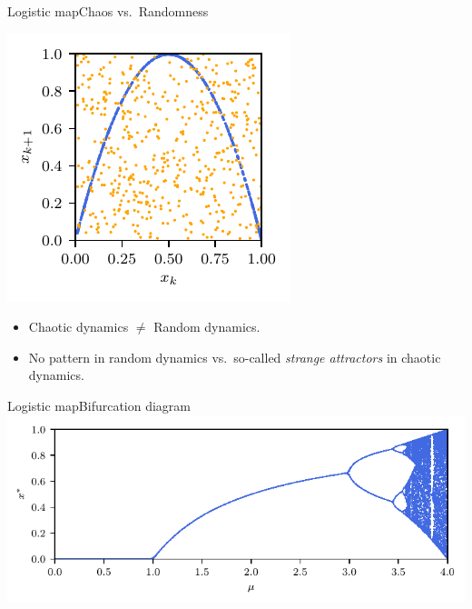 \documentclass[usenames,dvipsnames,svgnames,10pt,aspectratio=169]{beamer}
\begin{document}
\begin{frame}[t, c]{Logistic map}{Chaos vs.\ Randomness}
	\begin{minipage}{.48\textwidth}
		\centering
		\includegraphics[width=.75\textwidth]{chaos_vs_randomness_phase_plane}
	\end{minipage}%
	\hfill
	\begin{minipage}{.48\textwidth}
		\begin{itemize}
			\item Chaotic dynamics $\neq$ Random dynamics.

			\medskip

			\item No pattern in random dynamics vs.\ so-called \emph{strange attractors} in chaotic dynamics.
		\end{itemize}
	\end{minipage}

	\vspace{1cm}
\end{frame}

\begin{frame}[t, c]{Logistic map}{Bifurcation diagram}
	\centering
	\includegraphics[width=.75\textwidth]{logistic_map_bifurcation_overview}

	\vspace{1cm}
\end{frame}
\end{document}
